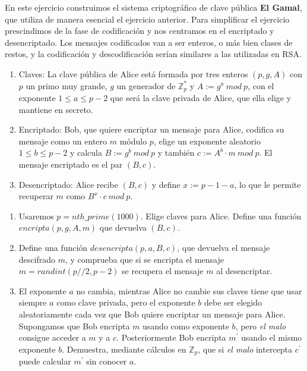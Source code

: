 \begin{ejer}
	
	En este ejercicio construimos el sistema criptográfico de clave pública  {\bf El Gamal}, que utiliza de manera esencial  el ejercicio anterior. Para simplificar el ejercicio prescindimos de la fase de codificación y nos centramos en el encriptado y desencriptado. Los mensajes codificados van a ser enteros, o más bien clases de restos, y la codificación y descodificación serían similares a las utilizadas en RSA. 
	
\begin{enumerate}
	\item  {\sc Claves}: La clave pública de Alice  está formada por tres enteros $(p,g,A)$ con $p$ un primo muy grande, $g$ un generador de $\mathbb{Z}_p^*$ y $A:=g^a\  mod\  p$,  con el exponente $1\le a\le p-2$ que ser\'a la clave privada de Alice, que ella elige  y mantiene en secreto. 
	
	\item  {\sc Encriptado}: Bob, que quiere encriptar un mensaje para Alice, codifica su mensaje como un entero $m$ módulo $p$, elige un exponente aleatorio $1\le b\le p-2$ y calcula $B:=g^b\  mod\  p$ y también $c:=A^b\cdot m \  mod\  p$. El mensaje encriptado es el par $(B,c).$ 
	
	\item  {\sc Desencriptado}: Alice recibe $(B,c)$ y define $x:=p-1-a$, lo que le permite recuperar $m$ como $B^x\cdot c \ mod\ p$.
	
	\end{enumerate}
	
	\begin{enumerate}
	\item  Usaremos $p= nth\_prime(1000)$. Elige claves para Alice. Define una función $encripta(p,g,A,m)$ que devuelva $(B,c)$.
	
	\item  Define una función $desencripta(p,a,B,c)$, que devuelva el mensaje descifrado $m$, y comprueba que si se encripta el mensaje $m=randint(p//2,p-2)$ se recupera el mensaje $m$ al desencriptar.
	
	\item El exponente $a$ no cambia, mientras Alice no cambie sus claves tiene que usar siempre $a$ como clave privada, pero el exponente $b$  debe ser elegido aleatoriamente cada vez que Bob quiere encriptar un mensaje para Alice. Supongamos que  Bob encripta $m$ usando como exponente $b$, pero {\itshape el malo} consigue acceder a $m$ y a $c$. Posteriormente Bob encripta $m^{\prime}$ usando el mismo exponente $b$. Demuestra, mediante cálculos en $\mathbb{Z}_p$,  que si {\itshape el malo} intercepta $c^{\prime}$ puede calcular $m^{\prime}$ sin conocer $a$. 
	
	\end{enumerate}
	
	\end{ejer}
	
	
